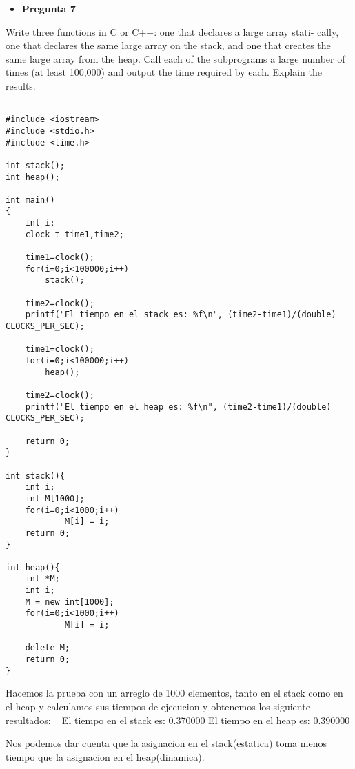 \documentclass[../main.tex]{subfiles}
\begin{document}
\begin{itemize}
	\item \textbf{Pregunta 7}
\end{itemize}
	Write three functions in C or C++: one that declares a large array stati-
	cally, one that declares the same large array on the stack, and one that
	creates the same large array from the heap. Call each of the subprograms
	a large number of times (at least 100,000) and output the time required
	by each. Explain the results.\newline

\begin{lstlisting}[belowcaptionskip=.5em,caption={C\'odigo en lenguaje C\#.}]
	
#include <iostream>
#include <stdio.h>
#include <time.h>

int stack();
int heap();

int main()
{
	int i;
    clock_t time1,time2;

    time1=clock();
    for(i=0;i<100000;i++)
		stack();
			
    time2=clock();
    printf("El tiempo en el stack es: %f\n", (time2-time1)/(double) CLOCKS_PER_SEC);

	time1=clock();
    for(i=0;i<100000;i++)
		heap();           
    
    time2=clock();
    printf("El tiempo en el heap es: %f\n", (time2-time1)/(double) CLOCKS_PER_SEC);

    return 0;
}

int stack(){
	int i;
    int M[1000];
    for(i=0;i<1000;i++)
    		M[i] = i;
    return 0;
}

int heap(){
	int *M;
    int i;
    M = new int[1000];
    for(i=0;i<1000;i++)
    		M[i] = i;

    delete M;
    return 0;
}
\end{lstlisting}
Hacemos la prueba con un arreglo de 1000 elementos, tanto en el stack como en el heap y calculamos sus tiempos de ejecucion y obtenemos los siguiente resultados:
~\newline
El tiempo en el stack es: 0.370000\newline
El tiempo en el heap es: 0.390000\newline

Nos podemos dar cuenta que la asignacion en el stack(estatica) toma menos tiempo que la asignacion en el heap(dinamica).
\clearpage
\end{document}
